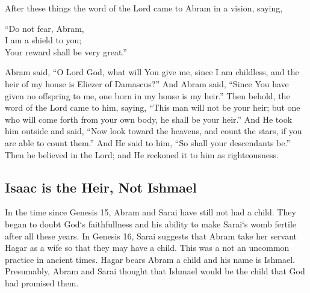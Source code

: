 \begin{scripture}[Genesis 15:1-6]
\noindent{} 
    After these things  
    the word of the Lord came to Abram in a vision, saying,
    \vspace{1\baselineskip}

    “Do not fear, Abram,\\ 
    I am a shield to you;\\
    Your reward shall be very great.”\\

    \vspace{1\baselineskip}

   \noindent{}Abram said, 
    “O Lord God, what will You give me, since I am childless, and the heir of my house is Eliezer of Damascus?” 
    And Abram said, “Since You have 
    given no offspring to me, one born in my house is my heir.” 
    Then behold, the word of the Lord came to him, saying,
    “This man will not be your heir; but one who will come forth from your own body, he shall be your heir.”
    And He took him outside and said,
     “Now look toward the heavens, and count the stars, if you are able to count them.” 
     And He said to him, “So shall your descendants be.” 
    Then he believed in the Lord; and He reckoned it to him as righteousness.
\end{scripture}

\subsection{Isaac is the Heir, Not Ishmael}
\begin{fullwidth}
    In the time since Genesis 15, Abram and Sarai have still not had a child. They began to doubt God`s faithfullness and his ability to make Sarai`s womb fertile after all these years. In Genesis 16, Sarai suggests that Abram take her servant Hagar as a wife so that they may have a child. This was 
    a not an uncommon practice in ancient times. Hagar bears Abram a child and his name is Ishmael. Presumably, Abram and Sarai thought that Ishmael would be the child that God had promised them.
    \end{fullwidth}

